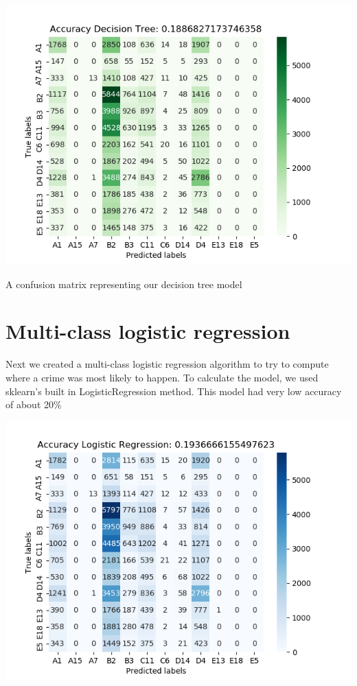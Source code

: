 \documentclass[a0,landscape]{a0poster}
\let\Section=\section
\def\section{\setcounter{equation}{0}\Section}
\newcommand{\1}{\bold{1}}
\begin{document}
\begin{multicols}{3}
\begin{center}
    \includegraphics[scale = 2]{decision_tree_cm.png}
    
    A confusion matrix representing our decision tree model
\end{center}

\section{Multi-class logistic regression}
Next we created a multi-class logistic regression algorithm to try to compute where a crime was most likely to happen. To calculate the model, we used sklearn's built in LogisticRegression method.  This model had very low accuracy of about 20\% 
 \begin{center}
    \includegraphics[scale = 2]{lr_cm.png}
  

\end{center}
\end{multicols}
\end{document}
